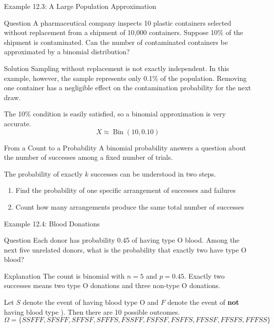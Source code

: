 \documentclass[aspectratio=169]{beamer}
\begin{document}
\begin{frame}{Example 12.3: A Large Population Approximation}
\begin{block}{Question}
A pharmaceutical company inspects 10 plastic containers selected without replacement from a shipment of 10{,}000 containers. Suppose 10\% of the shipment is contaminated. Can the number of contaminated containers be approximated by a binomial distribution?
\end{block}

\begin{block}{Solution}
Sampling without replacement is not exactly independent. In this example, however, the sample represents only 0.1\% of the population. Removing one container has a negligible effect on the contamination probability for the next draw.

The 10\% condition is easily satisfied, so a binomial approximation is very accurate.
$$X \approx \operatorname{Bin}(10,0.10)$$
\end{block}
\end{frame}

\begin{frame}{From a Count to a Probability}
A binomial probability answers a question about the number of successes among a fixed number of trials.

\vspace{0.2cm}
The probability of exactly $k$ successes can be understood in two steps.
\begin{enumerate}
	\item Find the probability of one specific arrangement of successes and failures
  	\item Count how many arrangements produce the same total number of successes
\end{enumerate}
\end{frame}

\begin{frame}{Example 12.4: Blood Donations}
\begin{block}{Question}
Each donor has probability 0.45 of having type O blood. Among the next five unrelated donors, what is the probability that exactly two have type O blood?
\end{block}

\begin{block}{Explanation}
The count is binomial with $n=5$ and $p=0.45$. Exactly two successes means two type O donations and three non-type O donations.
\end{block}

Let $S$ denote the event of having blood type O and $F$ denote the event of \textbf{not} having blood type ). Then there are 10 possible outcomes. 
$$\Omega = \{SSFFF, SFSFF, SFFSF, SFFFS, FSSFF, FSFSF, FSFFS, FFSSF, FFSFS, FFFSS\}$$
\end{frame}
\end{document}
